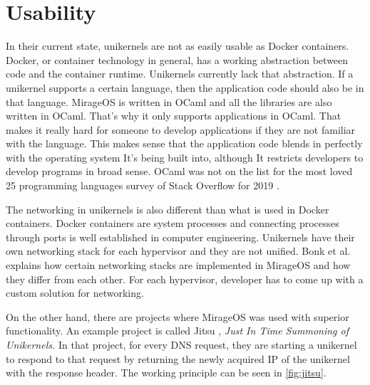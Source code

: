 \section{Usability}
In their current state, unikernels are not as easily usable as Docker containers. Docker, or container technology in general, has a working abstraction between code and the container runtime. Unikernels currently lack that abstraction. If a unikernel supports a certain language, then the application code should also be in that language. MirageOS is written in OCaml and all the libraries are also written in OCaml. That's why it only supports applications in OCaml. That makes it really hard for someone to develop applications if they are not familiar with the language. This makes sense that the application code blends in perfectly with the operating system It's being built into, although It restricts developers to develop programs in broad sense. OCaml was not on the list for the most loved 25 programming languages survey of Stack Overflow for 2019 \cite{2019-survey}.

The networking in unikernels is also different than what is used in Docker containers. Docker containers are system processes and connecting processes through ports is well established in computer engineering. Unikernels have their own networking stack for each hypervisor and they are not unified. Bonk et al. \cite{Bonk} explains how certain networking stacks are implemented in MirageOS and how they differ from each other. For each hypervisor, developer has to come up with a custom solution for networking.

On the other hand, there are projects where MirageOS was used with superior functionality. An example project is called Jitsu \cite{jitsu}, \textit{Just In Time Summoning of Unikernels.} In that project, for every DNS request, they are starting a unikernel to respond to that request by returning the newly acquired IP of the unikernel with the response header. The working principle can be seen in \ref{fig:jitsu}.

